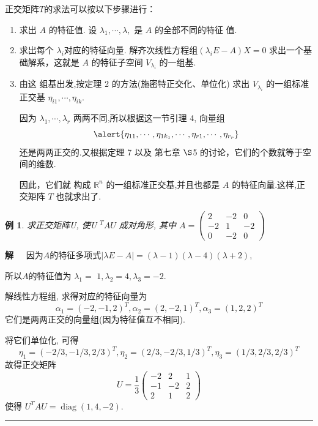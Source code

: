 \documentclass[13pt]{beamer}
\newtheorem{exa}{例}
\def\qed{\nopagebreak\hfill{\rule{4pt}{7pt}}\medbreak}
\def\sol{{\bf 解~~ }}
\def\Rn{\mathbb{R}^n}
\begin{document}
\begin{frame}
正交矩阵$T$的求法可以按以下步骤进行：



\begin{enumerate}
	\item 求出 $A$ 的\alert{特征值}. 设 $\lambda_{1}, \cdots, \lambda,$ 是 ${A}$ 的全部不同的特征
	值. 
	\item 求出每个 $\lambda_{i}$对应的\alert{特征向量}. 解齐次线性方程组$\left(\lambda_{i} {E}-{A}\right)X={0}$
	求出一个基础解系，这就是 $A$ 的特征子空间 $V_{\lambda_{i}}$ 的一组基.
	\item 
	由这 组基出发,按定理 2 的方法(\alert{施密特正交化}、{单位化}) 求出 $V_{\lambda_{i}}$ 的一组标准正交基 ${\eta}_{i 1}, \cdots,{\eta}_{i k}$.  
		
	因为 $\lambda_{1}, \cdots, \lambda_{r}$ 两两不同,所以根据这一节引理 4, 向量组
	$$\alert{{\eta}_{11}, \cdots, {\eta}_{1 k_{1}}, \cdots, {\eta}_{r 1}, \cdots, {\eta}_{r_{r}}}$$ 还是两两正交的.又根据定理 7 以及
	第七章 $\S$5 的讨论，它们的个数就等于空间的维数.
	
		因此，它们就 构成 $\Rn$ 的一组\alert{标准正交基},并且也都是 $A$ 的特征向量.这样,正 交矩阵 $T$ 也就求出了. 
\end{enumerate}
\end{frame}

\begin{frame}
\begin{exa}
求正交矩阵U, 使U $^{T} A U$ 成对角形, 其中 $A = \left(\begin{array}{ccc}2 & -2 & 0 \\ -2 & 1 & -2 \\ 0 & -2 & 0\end{array}\right)$
\end{exa}
\pause
\sol 因为$A$的特征多项式$|\lambda E - A |=(\lambda-1)(\lambda-4)(\lambda+2),$ 

所以$A$的特征值为 $\lambda_{1}=$ $1, \lambda_{2}=4, \lambda_{3}=-2 .$ 

解线性方程组, 求得对应的特征向量为
\[
\alpha_{1}=(-2,-1,2)^{T}, \alpha_{2}=(2,-2,1)^{T}, \alpha_{3}=(1,2,2)^{T}
\]
它们是两两正交的向量组(因为特征值互不相同).
\end{frame}

\begin{frame}
将它们单位化, 可得
\[
\eta_{1}=(-2 / 3,-1 / 3,2 / 3)^{T}, \eta_{2}=(2 / 3,-2 / 3,1 / 3)^{T}, \eta_{3}=(1 / 3,2 / 3,2 / 3)^{T}
\]
故得正交矩阵
\[
U=\frac{1}{3}\left(\begin{array}{ccc}
-2 & 2 & 1 \\
-1 & -2 & 2 \\
2 & 1 & 2
\end{array}\right)
\]
使得 $U^{T} A U=\operatorname{diag}(1,4,-2)$.
\qed
\end{frame}
\end{document}
